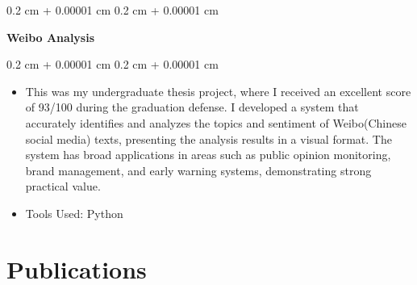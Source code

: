 \documentclass[10pt, letterpaper]{article}
\newenvironment{highlights}{
    \begin{itemize}[
        topsep=0.10 cm,
        parsep=0.10 cm,
        partopsep=0pt,
        itemsep=0pt,
        leftmargin=0.4 cm + 10pt
    ]
}{
    \end{itemize}
} %
\newenvironment{onecolentry}{
    \begin{adjustwidth}{
        0.2 cm + 0.00001 cm
    }{
        0.2 cm + 0.00001 cm
    }
}{
    \end{adjustwidth}
} %
\newenvironment{twocolentry}[2][]{
    \onecolentry
    \def\secondColumn{#2}
    \setcolumnwidth{\fill, 4.5 cm}
    \begin{paracol}{2}
}{
    \switchcolumn \raggedleft \secondColumn
    \end{paracol}
    \endonecolentry
} %
\begin{document}
    \vspace{0.2 cm}

        \begin{twocolentry}{
            }
            \textbf{Weibo Analysis}
        \end{twocolentry}

        \vspace{0.10 cm}
        \begin{onecolentry}
            \begin{highlights}
                \item This was my undergraduate thesis project, where I received an excellent score of 93/100 during the graduation defense. I developed a system that accurately identifies and analyzes the topics and sentiment of Weibo(Chinese social media) texts, presenting the analysis results in a visual format. The system has broad applications in areas such as public opinion monitoring, brand management, and early warning systems, demonstrating strong practical value.
                \item Tools Used: Python
            \end{highlights}
        \end{onecolentry}

    \section{Publications}
\end{document}
